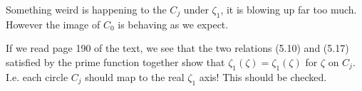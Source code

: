\documentclass[a4paper,10pt]{article}
\begin{document}
 Something weird is happening to the $C_j$ under $\zeta_1$, it is blowing up far too much. However the image of $C_0$ is behaving as we expect. 
 
 If we read page 190 of the text, we see that the two relations (5.10) and (5.17) satisfied by the prime function together show that $\zeta_1(\zeta) = \zeta_1(\zeta)$ for $\zeta$ on $C_j$. I.e. each circle $C_j$ should map to the real $\zeta_1$ axis! This should be checked.
\end{document}
